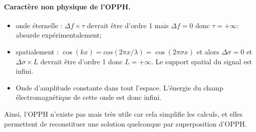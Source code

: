 \paragraph{Caractère non physique de l'OPPH.}
\begin{itemize}
    \item onde éternelle : $\Delta f\times\tau$ devrait être d'ordre 1 mais $\Delta f=0$ donc $\tau=+\infty$: absurde expérimentalement;
    \item spatialement : $\cos(kx)=cos(2\pi x/\lambda)=\cos(2\pi\sigma x)$ et alors $\Delta\sigma=0$ et $\Delta\sigma\times L$ devrait être d'ordre 1 donc $L=+\infty$. Le support spatial du signal est infini.
    \item Onde d'amplitude constante dans tout l'espace. L'énergie du champ électromagnétique de cette onde est donc infini.
\end{itemize}

Ainsi, l'OPPH n'existe pas mais très utile car cela simplifie les calculs, et elles permettent de reconstituer une solution quelconque par superposition d'OPPH.